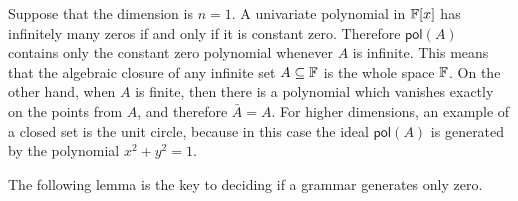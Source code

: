 \begin{example} Suppose that the dimension is $n=1$. A univariate polynomial in $\mathbb F[x]$  has infinitely many zeros if and only if it is constant zero. Therefore $\mathsf{pol}(A)$ contains only the constant zero polynomial whenever $A$ is infinite. This means that the algebraic closure of any infinite set $A \subseteq \mathbb F$ is the whole space $\mathbb F$. On the other hand, when $A$ is finite, then there is a polynomial which vanishes exactly on the points from $A$, and therefore $\bar A = A$. For higher dimensions, an example of a closed set is the unit circle, because in this case the ideal $\mathsf{pol}(A)$ is generated by the polynomial $x^2 + y^2 = 1$.
\end{example}










The following lemma is the key to deciding if a grammar generates only zero.

